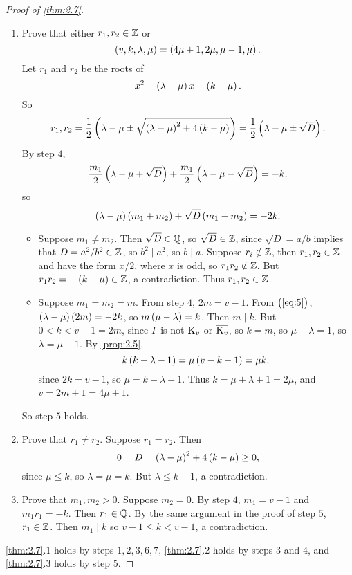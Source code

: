 \begin{proof}[Proof of \ref{thm:2.7}]
\begin{enumerate}[leftmargin=0.5in, label=Step \arabic*.]

\item Prove that either $ r_1, r_2 \in \mathbb{Z} $ or
$$ \br{v, k, \lambda, \mu} = \br{4\mu + 1, 2\mu, \mu - 1, \mu}. $$
Let $ r_1 $ and $ r_2 $ be the roots of
$$ x^2 - \br{\lambda - \mu}x - \br{k - \mu}. $$
So
$$ r_1, r_2 = \dfrac{1}{2}\br{\lambda - \mu \pm \sqrt{\br{\lambda - \mu}^2 + 4\br{k - \mu}}} = \dfrac{1}{2}\br{\lambda - \mu \pm \sqrt{D}}. $$
By step $ 4 $,
$$ \dfrac{m_1}{2}\br{\lambda - \mu + \sqrt{D}} + \dfrac{m_1}{2}\br{\lambda - \mu - \sqrt{D}} = -k, $$
so
\begin{equation}
\label{eq:5}
\br{\lambda - \mu}\br{m_1 + m_2} + \sqrt{D}\br{m_1 - m_2} = -2k.
\end{equation}
\begin{itemize}
\item Suppose $ m_1 \ne m_2 $. Then $ \sqrt{D} \in \mathbb{Q} $, so $ \sqrt{D} \in \mathbb{Z} $, since $ \sqrt{D} = a / b $ implies that $ D = a^2 / b^2 \in \mathbb{Z} $, so $ b^2 \mid a^2 $, so $ b \mid a $. Suppose $ r_i \notin \mathbb{Z} $, then $ r_1, r_2 \in \mathbb{Z} $ and have the form $ x / 2 $, where $ x $ is odd, so $ r_1r_2 \notin \mathbb{Z} $. But $ r_1r_2 = -\br{k - \mu} \in \ZZ $, a contradiction. Thus $ r_1, r_2 \in \mathbb{Z} $.
\item Suppose $ m_1 = m_2 = m $. From step $ 4 $, $ 2m = v - 1 $. From $ \br{\ref{eq:5}} $, $ \br{\lambda - \mu}\br{2m} = -2k $, so $ m\br{\mu - \lambda} = k $. Then $ m \mid k $. But $ 0 < k < v - 1 = 2m $, since $ \Gamma $ is not $ \mathrm{K}_v $ or $ \overline{\mathrm{K}_v} $, so $ k = m $, so $ \mu - \lambda = 1 $, so $ \lambda = \mu - 1 $. By \ref{prop:2.5},
$$ k\br{k - \lambda - 1} = \mu\br{v - k - 1} = \mu k, $$
since $ 2k = v - 1 $, so $ \mu = k - \lambda - 1 $. Thus $ k = \mu + \lambda + 1 = 2\mu $, and $ v = 2m + 1 = 4\mu + 1 $.
\end{itemize}
So step $ 5 $ holds.
\item Prove that $ r_1 \ne r_2 $. Suppose $ r_1 = r_2 $. Then
$$ 0 = D = \br{\lambda - \mu}^2 + 4\br{k - \mu} \ge 0, $$
since $ \mu \le k $, so $ \lambda = \mu = k $. But $ \lambda \le k - 1 $, a contradiction.
\item Prove that $ m_1, m_2 > 0 $. Suppose $ m_2 = 0 $. By step $ 4 $, $ m_1 = v - 1 $ and $ m_1r_1 = -k $. Then $ r_1 \in \mathbb{Q} $. By the same argument in the proof of step $ 5 $, $ r_1 \in \mathbb{Z} $. Then $ m_1 \mid k $ so $ v - 1 \le k < v - 1 $, a contradiction.
\end{enumerate}
\ref{thm:2.7}.$ 1 $ holds by steps $ 1, 2, 3, 6, 7 $, \ref{thm:2.7}.$ 2 $ holds by steps $ 3 $ and $ 4 $, and \ref{thm:2.7}.$ 3 $ holds by step $ 5 $.
\end{proof}

